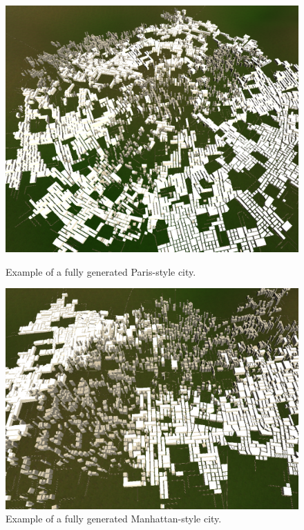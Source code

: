 \begin{figure}[H]
  \centering
  \begin{minipage}{.45\textwidth}
    \centering
    \begin{minipage}{.9\textwidth}
      \centering
      \includegraphics[width=\textwidth]{figure/results/city_paris.png}
      \caption{Example of a fully generated Paris-style city.}
      \label{fig:results_city_paris}
    \end{minipage}
  \end{minipage}
  \begin{minipage}{.45\textwidth}
    \begin{minipage}{.9\textwidth}
      \centering
      \centering
      \includegraphics[width=\textwidth]{figure/results/city_manhattan.png}
      \caption{Example of a fully generated Manhattan-style city.}
      \label{fig:results_city_manhattan}
    \end{minipage}
  \end{minipage}
\end{figure}

